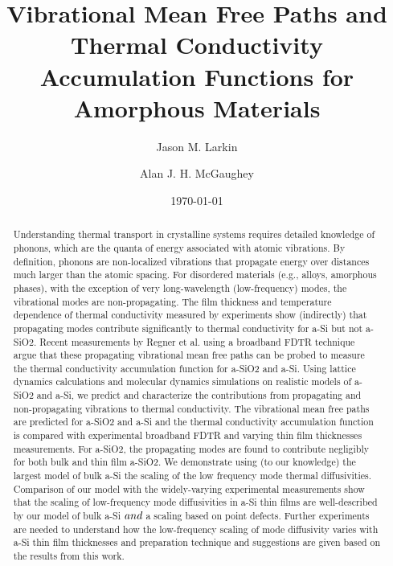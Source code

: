 \documentclass[aps,prb,onecolumn,preprint,superscriptaddress,footinbib,amsmath,amssymb,floatfix]{revtex4}
\begin{document}
\title{Vibrational Mean Free Paths and Thermal Conductivity 
Accumulation Functions for Amorphous Materials}
\author{Jason M. Larkin}
\author{Alan J. H. McGaughey}
\date{\today}
\begin{abstract}

Understanding thermal transport in crystalline systems requires detailed 
knowledge of phonons, which are the quanta of energy associated with 
atomic 
vibrations. By definition, phonons are non-localized vibrations that 
propagate energy over distances much larger than the atomic spacing. For 
disordered materials (e.g., alloys, amorphous phases), with the 
exception 
of very long-wavelength (low-frequency) modes, the vibrational modes are 
non-propagating. The film thickness and temperature dependence 
of thermal conductivity measured by experiments show 
(indirectly) that propagating modes contribute 
significantly to thermal conductivity for a-Si but not a-SiO2. 
Recent measurements by Regner et al. using a 
broadband FDTR technique argue that these propagating vibrational 
mean free paths can 
be probed to measure the 
thermal conductivity accumulation function for a-SiO2 and a-Si.   
Using lattice dynamics calculations and molecular dynamics simulations 
on 
realistic models of a-SiO2 and a-Si, we predict and 
characterize the contributions from propagating and non-propagating 
vibrations 
to thermal conductivity. The vibrational mean free paths are 
predicted for a-SiO2 and a-Si and the thermal 
conductivity accumulation function is compared with experimental 
broadband FDTR and varying thin film thicknesses measurements. 
For a-SiO2, the propagating modes are found to contribute 
negligibly for both bulk and thin film a-SiO2. We demonstrate using 
(to our knowledge) the largest model of bulk a-Si the scaling 
of the low frequency mode thermal diffusivities.  
Comparison of our model with 
the widely-varying experimental measurements  
show that the scaling of low-frequency mode diffusivities in a-Si 
thin films are well-described by our model 
of bulk a-Si $\emph{and}$ a scaling based on point defects. Further  
experiments are needed to understand how the low-frequency scaling 
of mode diffusivity varies with a-Si thin film thicknesses 
and preparation technique and suggestions are given based on 
the results from this work. 

\end{abstract}
\maketitle
\clearpage
\end{document}
